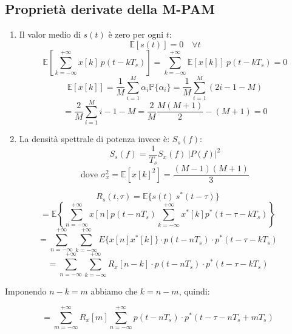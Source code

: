 \documentclass{article}
\begin{document}
\subsection*{Proprietà derivate della M-PAM}
\begin{enumerate}
    \item Il valor medio di \( s(t) \) è zero per ogni \( t \):
    \begin{equation*}
        \mathbb{E}\left[ s(t) \right] = 0 \quad \forall t
    \end{equation*}
    \begin{equation*}
        \mathbb{E} \left[ \sum_{k=-\infty}^{+\infty} x[k] \ p(t-kT_s) \right] = \sum_{k=-\infty}^{+\infty} \mathbb{E}\left[x[k]\right]\ p(t-kT_s) = 0
    \end{equation*}
    \begin{equation*}
        \mathbb{E}\left[x[k]\right] = \frac{1}{M} \sum_{i=1}^{M} \alpha_i \mathbb{P}\{\alpha_i\} = \frac{1}{M} \sum_{i=1}^{M} (2i - 1 - M)
    \end{equation*}
    \begin{equation*}
        = \frac{2}{M} \sum_{i=1}^{M} i - 1 - M = \frac{2}{M} \frac{M(M+1)}{2} - (M+1) = 0
    \end{equation*}

    \item La densità spettrale di potenza invece è: \( S_s(f) \):
    \begin{equation*}
        S_s(f) = \frac{1}{T_s} S_x(f) \ |P(f)|^2
    \end{equation*}
    \begin{equation*}
        \text{dove } \sigma_x^2 = \mathbb{E}\left[ x\left[k\right]^2 \right] = \frac{(M-1)(M+1)}{3}
    \end{equation*}
\end{enumerate}

\[
R_s(t,\tau) = \mathbb{E}\{s(t) \ s^*(t-\tau)\} 
\]
\[
= \mathbb{E} \left\{ \sum_{n=-\infty}^{+\infty} x\left[n\right] p(t - nT_s) \sum_{k=-\infty}^{+\infty} x^*\left[k\right] p^*(t - \tau - kT_s) \right\}
\]
\[
= \sum_{n=-\infty}^{+\infty} \sum_{k=-\infty}^{+\infty} E\{x\left[n\right] x^*\left[k\right]\} \cdot p(t - nT_s) \cdot p^*(t - \tau - kT_s)
\]
\[
= \sum_{n=-\infty}^{+\infty} \sum_{k=-\infty}^{+\infty} R_x\left[n-k\right] \cdot p(t - nT_s) \cdot p^*(t - \tau - kT_s)
\]

Imponendo \( n-k = m \) abbiamo che \( k = n-m \), quindi:

\[
= \sum_{m=-\infty}^{+\infty} R_x[m] \sum_{n=-\infty}^{+\infty} p(t - nT_s) \cdot p^*(t - \tau - nT_s + mT_s)
\]
\end{document}
